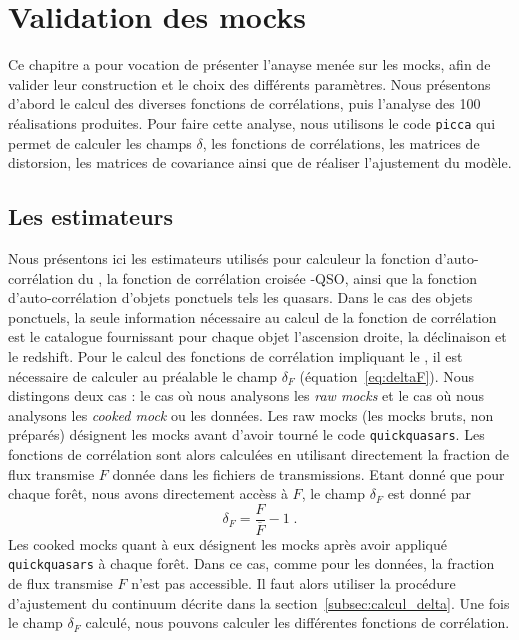 \documentclass[11pt, twoside, a4paper, openright]{report}
\begin{document}

\graphicspath{ {../figures/mocks/} }

\chapter{Validation des mocks}
\minitoc
\newpage
\thispagestyle{fancy}


Ce chapitre a pour vocation de présenter l'anayse menée sur les mocks, afin de valider leur construction et le choix des différents paramètres. Nous présentons d'abord le calcul des diverses fonctions de corrélations, puis l'analyse des 100 réalisations produites. Pour faire cette analyse, nous utilisons le code \texttt{picca} qui permet de calculer les champs $\delta$, les fonctions de corrélations, les matrices de distorsion, les matrices de covariance ainsi que de réaliser l'ajustement du modèle.

\section{Les estimateurs}
Nous présentons ici les estimateurs utilisés pour calculeur la fonction d'auto-corrélation du \lya{}, la fonction de corrélation croisée \lya{}-QSO, ainsi que la fonction d'auto-corrélation d'objets ponctuels tels les quasars.
Dans le cas des objets ponctuels, la seule information nécessaire au calcul de la fonction de corrélation est le catalogue fournissant pour chaque objet l'ascension droite, la déclinaison et le redshift. Pour le calcul des fonctions de corrélation impliquant le \lya{}, il est nécessaire de calculer au préalable le champ $\delta_F$ (équation~\ref{eq:deltaF}). Nous distingons deux cas : le cas où nous analysons les \emph{raw mocks} et le cas où nous analysons les \emph{cooked mock} ou les données.
Les raw mocks (les mocks bruts, non préparés) désignent les mocks avant d'avoir tourné le code \texttt{quickquasars}.
Les fonctions de corrélation sont alors calculées en utilisant directement la fraction de flux transmise $F$ donnée dans les fichiers de transmissions. Etant donné que pour chaque forêt, nous avons directement accèss à $F$, le champ $\delta_F$ est donné par
\begin{equation}
  \delta_F = \frac{F}{\overline F} - 1 \; .
\end{equation}
Les cooked mocks quant à eux désignent les mocks après avoir appliqué \texttt{quickquasars} à chaque forêt. Dans ce cas, comme pour les données, la fraction de flux transmise $F$ n'est pas accessible. Il faut alors utiliser la procédure d'ajustement du continuum décrite dans la section~\ref{subsec:calcul_delta}.
Une fois le champ $\delta_F$ calculé, nous pouvons calculer les différentes fonctions de corrélation.
\end{document}
